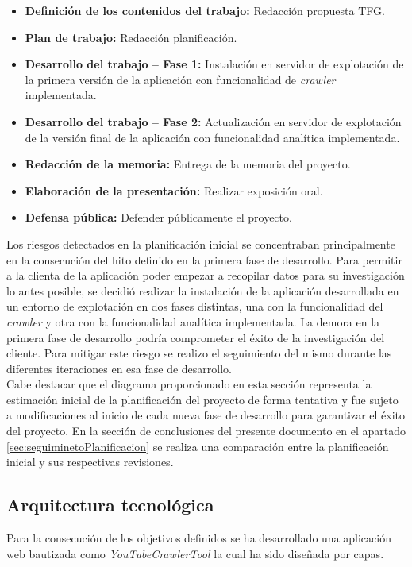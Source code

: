 \documentclass[11pt,a4paper]{article}
\begin{document}
\begin{itemize}
\item \textbf{Definición de los contenidos del trabajo:} Redacción propuesta TFG.
\item \textbf{Plan de trabajo:} Redacción planificación.
\item \textbf{Desarrollo del trabajo – Fase 1:} Instalación en servidor de explotación de la primera versión de la aplicación con funcionalidad de \textit{crawler} implementada.
\item \textbf{Desarrollo del trabajo – Fase 2:} Actualización en servidor de explotación de la versión final de la aplicación con funcionalidad analítica implementada.
\item \textbf{Redacción de la memoria:} Entrega de la memoria del proyecto.
\item \textbf{Elaboración de la presentación:} Realizar exposición oral.
\item \textbf{Defensa pública:} Defender públicamente el proyecto.
\end{itemize}

Los riesgos detectados en la planificación inicial se concentraban principalmente en la consecución del hito definido en la primera fase de desarrollo. Para permitir a la clienta de la aplicación poder empezar a recopilar datos para su investigación lo antes posible, se decidió realizar la instalación de la aplicación desarrollada en un entorno de explotación en dos fases distintas, una con la funcionalidad del \textit{crawler} y otra con la funcionalidad analítica implementada. La demora en la primera fase de desarrollo podría comprometer el éxito de la investigación del cliente. Para mitigar este riesgo se realizo el seguimiento del mismo durante las diferentes iteraciones en esa fase de desarrollo. 
\\

Cabe destacar que el diagrama proporcionado en esta sección representa la estimación inicial de la planificación del proyecto de forma tentativa y fue sujeto a modificaciones al inicio de cada nueva fase de desarrollo para garantizar el éxito del proyecto. En la sección de conclusiones del presente documento en el apartado \ref{sec:seguiminetoPlanificacion} se realiza una comparación entre la planificación inicial y sus respectivas revisiones.
\newpage


\subsection{Arquitectura tecnológica}
Para la consecución de los objetivos definidos se ha desarrollado una aplicación web bautizada como \textit{YouTubeCrawlerTool} la cual ha sido diseñada por capas.
\\
\end{document}
